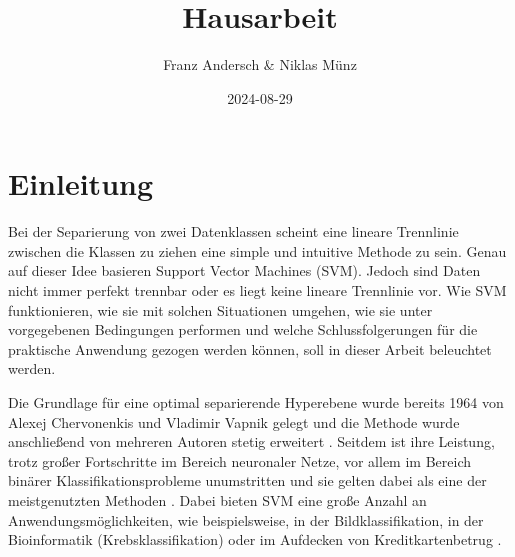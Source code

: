 \documentclass[
]{article}
\title{Hausarbeit}
\author{Franz Andersch \& Niklas Münz}
\date{2024-08-29}
\renewcommand{\maketitle}{}
\begin{document}
\maketitle


\newpage
\tableofcontents
\thispagestyle{empty}
\clearpage
{}
\section{Einleitung}

Bei der Separierung von zwei Datenklassen scheint eine lineare
Trennlinie zwischen die Klassen zu ziehen eine simple und intuitive
Methode zu sein. Genau auf dieser Idee basieren Support Vector Machines
(SVM). Jedoch sind Daten nicht immer perfekt trennbar oder es liegt
keine lineare Trennlinie vor. Wie SVM funktionieren, wie sie mit solchen
Situationen umgehen, wie sie unter vorgegebenen Bedingungen performen
und welche Schlussfolgerungen für die praktische Anwendung gezogen
werden können, soll in dieser Arbeit beleuchtet werden.

Die Grundlage für eine optimal separierende Hyperebene wurde bereits
1964 von Alexej Chervonenkis und Vladimir Vapnik gelegt und die Methode
wurde anschließend von mehreren Autoren stetig erweitert
\parencite{vapnikEstimationDependencesBased2006}. Seitdem ist ihre
Leistung, trotz großer Fortschritte im Bereich neuronaler Netze, vor
allem im Bereich binärer Klassifikationsprobleme unumstritten und sie
gelten dabei als eine der meistgenutzten Methoden
\parencite{soofiClassificationTechniquesMachine2017}. Dabei bieten SVM
eine große Anzahl an Anwendungsmöglichkeiten, wie beispielsweise, in der
Bildklassifikation, in der Bioinformatik (Krebsklassifikation) oder im
Aufdecken von Kreditkartenbetrug
\parencite{cervantesComprehensiveSurveySupport2020}.
\end{document}
